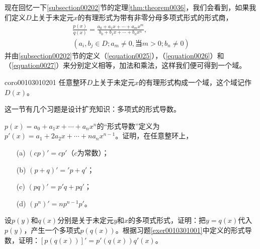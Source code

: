 现在回忆一下\ref{subsection00202}节的定理\ref{thm:theorem0036}，我们会看到，如果我们定义$D$上关于未定元$x$的有理形式为带有非零分母多项式形式的形式商，
\begin{gather*}
\frac{p(x)}{q(x)} = \frac{a_0+a_1x+\cdots+a_mx^m}{b_0+b_1x+\cdots+b_nx^n}, \\
(a_i, b_j \in D; a_m \neq 0, \text{当}m>0; b_n \neq 0)
\end{gather*}
并由\ref{subsection00202}节的定义（\ref{equation0025}），（\ref{equation0026}）和（\ref{equation0027}）来分别定义相等，加法和乘法，这样我们便可得到一个域。
\begin{corollary}{}{coro00103010201}
任意整环$D$上关于未定元$x$的有理形式构成一个域，这个域记作$D(x)$。
\end{corollary}

这一节有几个习题是设计扩充知识：多项式的形式导数。
\begin{exercise}\label{exer0010301001}
$p(x)=a_0+a_1x+\cdots+a_nx^n$的“形式导数”定义为$p'(x)=a_1+2a_2x+\cdots+na_nx^{n-1}$。证明，在任意整环上，
\begin{enumerate}
\item[(a)] $(cp)'=cp'$（$c$为常数）；
\item[(b)] $(p+q)'='p+q'$；
\item[(c)] $(pq)'=p'q+pq'$；
\item[(d)] $(p^n)'=np^{n-1}p'$。
\end{enumerate}
\end{exercise}
\begin{exercise}\label{exer0010301002}
设$p(y)$和$q(x)$分别是关于未定元$y$和$x$的多项式形式，证明：把$y=q(x)$代入$p(y)$，产生一个多项式$p(q(x))$。根据习题\ref{exer0010301001}中定义的形式导数，证明：$[p(q(x))]'=p'(q(x))q'(x)$。
\end{exercise}




